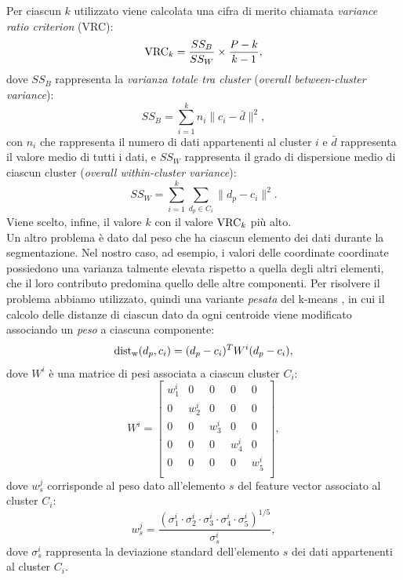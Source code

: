 Per ciascun $k$ utilizzato viene calcolata una cifra di merito chiamata \textit{variance ratio criterion} (VRC):
\[{\operatorname*{VRC}}_k = \frac{SS_B}{SS_W}\times\frac{P-k}{k-1},\]
dove $SS_B$ rappresenta la \textit{varianza totale tra cluster} (\textit{overall between-cluster variance}):
\[SS_B=\sum_{i=1}^{k}n_i\|c_i - \bar{d}\|^2, \]
con $n_i$ che rappresenta il numero di dati appartenenti al cluster $i$ e $\bar{d}$ rappresenta il valore medio di tutti  i dati, e $SS_W$ rappresenta il grado di dispersione medio di ciascun cluster (\textit{overall within-cluster variance}):
\[SS_W = \sum_{i=1}^{k}\sum_{d_p \in C_i}\|d_p-c_i\|^2.\]
Viene scelto, infine, il valore $k$ con il valore ${\operatorname*{VRC}}_k$ pi\`u alto.\\
Un altro problema \`e dato dal peso che ha ciascun elemento dei dati durante la segmentazione.
Nel nostro caso, ad esempio, i valori delle coordinate coordinate possiedono una varianza talmente elevata rispetto a quella degli altri elementi, che il loro contributo predomina quello delle altre componenti.
Per risolvere il problema abbiamo utilizzato, quindi una variante \textit{pesata} del k-means \cite{kottke1994motion}, in cui il calcolo delle distanze di ciascun dato da ogni centroide viene modificato associando un \textit{peso} a ciascuna componente:
\[{\operatorname*{dist}}_{\text{w}}(d_p, c_i)=(d_p - c_i)^TW^i(d_p-c_i),\]
dove $W^i$ \`e una matrice di pesi associata a ciascun cluster $C_i$:
\[W^i =
\left[\begin{array}{ccccc}
w_1^i & 0 & 0 & 0 & 0\\
0 & w_2^i & 0 & 0 & 0\\
0 & 0 & w_3^i& 0 & 0\\
0 & 0 & 0 & w_4^i & 0\\
0  & 0 & 0 & 0& w_5^i\\
\end{array}\right],
\]
dove $w_s^j$ corrisponde al peso dato all'elemento $s$ del feature vector associato al cluster $C_i$:
\[w_s^j= \frac{\left(\sigma_1^i \cdot \sigma_2^i \cdot \sigma_3^i\cdot \sigma_4^i\cdot \sigma_5^i\right)^{1/5}}{\sigma_s^i},\] 
dove $\sigma_s^i$ rappresenta la deviazione standard dell'elemento $s$ dei dati appartenenti al cluster $C_i$.
